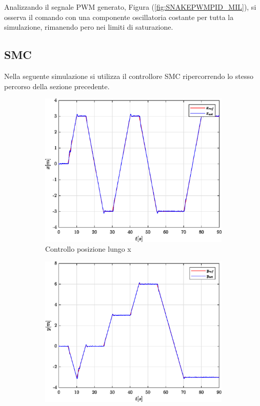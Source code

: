 Analizzando il segnale PWM generato, Figura (\ref{fig:SNAKEPWMPID_MIL}), si osserva il comando con una componente oscillatoria costante per tutta la simulazione, rimanendo pero nei limiti di saturazione.

\subsection{SMC}
Nella seguente simulazione si utilizza il controllore SMC ripercorrendo lo stesso percorso della sezione precedente.

\begin{figure}
	\centering
	\begin{subfigure}{0.45\textwidth}
		\centering
		\includegraphics[width=1\textwidth]{Simulazioni/Figure/SMC/SNAKE_MIL/PositionControlXPos}
		\caption{Controllo posizione lungo x}
		\label{fig:SNAKEerrposxSMC_MIL}
	\end{subfigure}
	\hfill
	\begin{subfigure}{0.45\textwidth}
		\centering
		\includegraphics[width=1\textwidth]{Simulazioni/Figure/SMC/SNAKE_MIL/PositionControlYPos}

\end{subfigure}
\end{figure}
